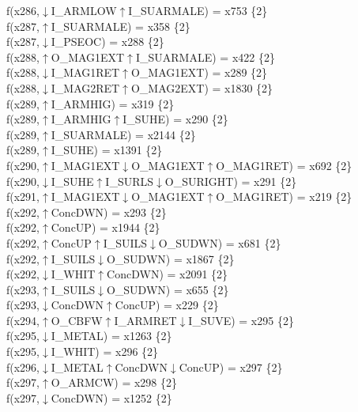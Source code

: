 f(x286,$\downarrow$I\_ARMLOW$\uparrow$I\_SUARMALE) = x753 \{2\} \\  
f(x287,$\uparrow$I\_SUARMALE) = x358 \{2\} \\  
f(x287,$\downarrow$I\_PSEOC) = x288 \{2\} \\  
f(x288,$\uparrow$O\_MAG1EXT$\uparrow$I\_SUARMALE) = x422 \{2\} \\  
f(x288,$\downarrow$I\_MAG1RET$\uparrow$O\_MAG1EXT) = x289 \{2\} \\  
f(x288,$\downarrow$I\_MAG2RET$\uparrow$O\_MAG2EXT) = x1830 \{2\} \\  
f(x289,$\uparrow$I\_ARMHIG) = x319 \{2\} \\  
f(x289,$\uparrow$I\_ARMHIG$\uparrow$I\_SUHE) = x290 \{2\} \\  
f(x289,$\uparrow$I\_SUARMALE) = x2144 \{2\} \\  
f(x289,$\uparrow$I\_SUHE) = x1391 \{2\} \\  
f(x290,$\uparrow$I\_MAG1EXT$\downarrow$O\_MAG1EXT$\uparrow$O\_MAG1RET) = x692 \{2\} \\  
f(x290,$\downarrow$I\_SUHE$\uparrow$I\_SURLS$\downarrow$O\_SURIGHT) = x291 \{2\} \\  
f(x291,$\uparrow$I\_MAG1EXT$\downarrow$O\_MAG1EXT$\uparrow$O\_MAG1RET) = x219 \{2\} \\  
f(x292,$\uparrow$ConcDWN) = x293 \{2\} \\  
f(x292,$\uparrow$ConcUP) = x1944 \{2\} \\  
f(x292,$\uparrow$ConcUP$\uparrow$I\_SUILS$\downarrow$O\_SUDWN) = x681 \{2\} \\  
f(x292,$\uparrow$I\_SUILS$\downarrow$O\_SUDWN) = x1867 \{2\} \\  
f(x292,$\downarrow$I\_WHIT$\uparrow$ConcDWN) = x2091 \{2\} \\  
f(x293,$\uparrow$I\_SUILS$\downarrow$O\_SUDWN) = x655 \{2\} \\  
f(x293,$\downarrow$ConcDWN$\uparrow$ConcUP) = x229 \{2\} \\  
f(x294,$\uparrow$O\_CBFW$\uparrow$I\_ARMRET$\downarrow$I\_SUVE) = x295 \{2\} \\  
f(x295,$\downarrow$I\_METAL) = x1263 \{2\} \\  
f(x295,$\downarrow$I\_WHIT) = x296 \{2\} \\  
f(x296,$\downarrow$I\_METAL$\uparrow$ConcDWN$\downarrow$ConcUP) = x297 \{2\} \\  
f(x297,$\uparrow$O\_ARMCW) = x298 \{2\} \\  
f(x297,$\downarrow$ConcDWN) = x1252 \{2\} \\  
